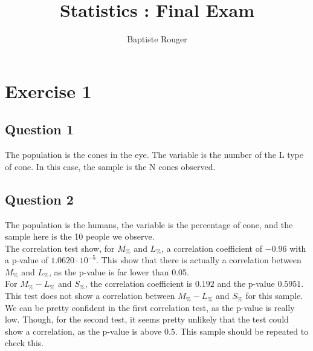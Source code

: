 \documentclass[12pt,a4paper]{article}
\author{Baptiste Rouger}
\title{Statistics : Final Exam}
\begin{document}
\maketitle
\section*{Exercise 1}
\subsection*{Question 1}
The population is the cones in the eye. The variable is the number of the L type of cone. In this case, the sample is the N cones observed.

\subsection*{Question 2}
The population is the humans, the variable is the percentage of cone, and the sample here is the 10 people we observe.\\
The correlation test show, for $M_\%$ and $L_\%$, a correlation coefficient of $-0.96$ with a p-value of $1.0620\cdot 10^{-5}$. This show that there is actually a correlation between $M_\%$ and $L_\%$, as the p-value is far lower than 0.05.\\
For $M_\% - L_\%$ and $S_\%$, the correlation coefficient is $0.192$ and the p-value $0.5951$. This test does not show a correlation between $M_\% - L_\%$ and $S_\%$ for this sample.\\
We can be pretty confident in the first correlation test, as the p-value is really low. Though, for the second test, it seems pretty unlikely that the test could show a correlation, as the p-value is above $0.5$. This sample should be repeated to check this.
\end{document}
